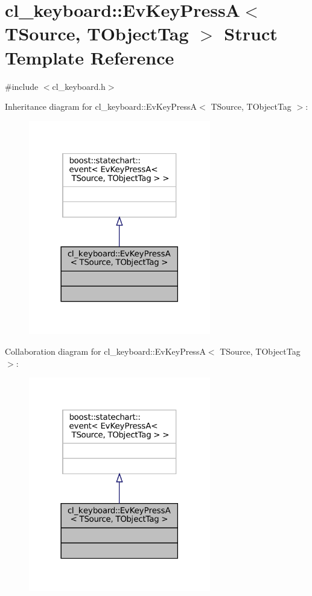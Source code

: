 \hypertarget{structcl__keyboard_1_1EvKeyPressA}{}\section{cl\+\_\+keyboard\+:\+:Ev\+Key\+PressA$<$ T\+Source, T\+Object\+Tag $>$ Struct Template Reference}
\label{structcl__keyboard_1_1EvKeyPressA}


{\ttfamily \#include $<$cl\+\_\+keyboard.\+h$>$}



Inheritance diagram for cl\+\_\+keyboard\+:\+:Ev\+Key\+PressA$<$ T\+Source, T\+Object\+Tag $>$\+:
\nopagebreak
\begin{figure}[H]
\begin{center}
\leavevmode
\includegraphics[width=225pt]{structcl__keyboard_1_1EvKeyPressA__inherit__graph}
\end{center}
\end{figure}


Collaboration diagram for cl\+\_\+keyboard\+:\+:Ev\+Key\+PressA$<$ T\+Source, T\+Object\+Tag $>$\+:
\nopagebreak
\begin{figure}[H]
\begin{center}
\leavevmode
\includegraphics[width=225pt]{structcl__keyboard_1_1EvKeyPressA__coll__graph}
\end{center}
\end{figure}


